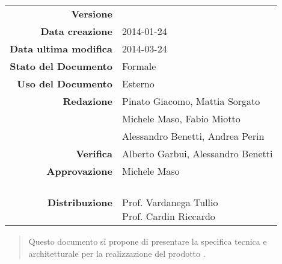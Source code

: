 


\newcommand{\Versione}{\versioneSpecificaTecnica{}}	  %
\newcommand{\Data}{2014-01-24}				           %
\newcommand{\DataUltimaModifica}{2014-03-24}
\newcommand{\TipoDocumento}{Specifica Tecnica}	       %



\begin{center}
\begin{tabular}{r|l}
\textbf{Versione} & \Versione{} \\
\textbf{Data creazione} & \Data{} \\
\textbf{Data ultima modifica} & \DataUltimaModifica{} \\
\textbf{Stato del Documento} & Formale \\		          %
\textbf{Uso del Documento} & Esterno \\			          %
\textbf{Redazione} &  Pinato Giacomo, Mattia Sorgato\\	  %
					& Michele Maso, Fabio Miotto\\
					& Alessandro Benetti, Andrea Perin\\
\textbf{Verifica} & Alberto Garbui, Alessandro Benetti\\  %
\textbf{Approvazione} & Michele Maso\\				      %
\textbf{Distribuzione} & \parbox[t]{4cm}{\NomeGruppo{}\\Prof. Vardanega Tullio\\Prof. Cardin Riccardo\\ \Prop{} }\\
\end{tabular}
\end{center}

\vspace{0.05in}

\begin{abstract}
\begin{center}
Questo documento si propone di presentare la specifica tecnica e architetturale per la realizzazione del prodotto \Progetto{}.
\end{center}
\end{abstract}


